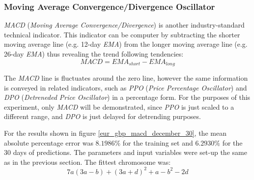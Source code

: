 \documentclass[a4paper,12pt]{article}
\begin{document}
\subsubsection{Moving Average Convergence/Divergence Oscillator}

	\textit{MACD}\cite{appel1985moving} (\textit{Moving Average Convergence/Divergence}) is another industry-standard technical indicator. This indicator can be computer by subtracting the shorter moving average line (e.g. 12-day \textit{EMA}) from the longer moving average line (e.g. 26-day \textit{EMA}) thus revealing the trend following tendencies:\\
	$$ MACD = EMA_{short} - EMA_{long} $$

	The \textit{MACD} line is fluctuates around the zero line, however the same information is conveyed in related indicators\cite{appel2011technical}, such as \textit{PPO} (\textit{Price Percentage Oscillator}) and \textit{DPO} (\textit{Detreneded Price Oscillator}) in a percentage form. For the purposes of this experiment, only \textit{MACD} will be demonstrated, since \textit{PPO} is just scaled to a different range, and \textit{DPO} is just delayed for detrending purposes.

	For the results shown in figure \ref{eur_gbp_macd_december_30}, the mean absolute percentage error was $8.1986\%$ for the training set and $6.2930\%$ for the 30 days of predictions. The parameters and input variables were set-up the same as in the previous section. The fittest chromosome was:\\
	$$ 7a (3a - b) + (3a + d)^2 + a - b^2 - 2d $$
\end{document}
